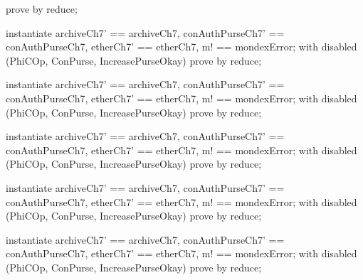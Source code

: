 \begin{LPScript}\begin{zproof}[tCIgnoreIsTotal]
    prove by reduce;
\end{zproof}\end{LPScript}

\begin{LPScript}\begin{zproof}[tCIncreaseIsTotal]
    instantiate archiveCh7' == archiveCh7,
        conAuthPurseCh7' == conAuthPurseCh7,
        etherCh7' == etherCh7, m! == mondexError;
    with disabled (PhiCOp, ConPurse, IncreasePurseOkay) prove by reduce;
\end{zproof}\end{LPScript}

\begin{LPScript}\begin{zproof}[tCAbortIsTotal]
    instantiate archiveCh7' == archiveCh7,
        conAuthPurseCh7' == conAuthPurseCh7,
        etherCh7' == etherCh7, m! == mondexError;
    with disabled (PhiCOp, ConPurse, IncreasePurseOkay) prove by reduce;
\end{zproof}\end{LPScript}

\begin{LPScript}\begin{zproof}[tCStartFromIsTotal]
    instantiate archiveCh7' == archiveCh7,
        conAuthPurseCh7' == conAuthPurseCh7,
        etherCh7' == etherCh7, m! == mondexError;
    with disabled (PhiCOp, ConPurse, IncreasePurseOkay) prove by reduce;
\end{zproof}\end{LPScript}

\begin{LPScript}\begin{zproof}[tCStartToIsTotal]
    instantiate archiveCh7' == archiveCh7,
        conAuthPurseCh7' == conAuthPurseCh7,
        etherCh7' == etherCh7, m! == mondexError;
    with disabled (PhiCOp, ConPurse, IncreasePurseOkay) prove by reduce;
\end{zproof}\end{LPScript}

\begin{LPScript}\begin{zproof}[tCReqIsTotal]
    instantiate archiveCh7' == archiveCh7,
        conAuthPurseCh7' == conAuthPurseCh7,
        etherCh7' == etherCh7, m! == mondexError;
    with disabled (PhiCOp, ConPurse, IncreasePurseOkay) prove by reduce;
\end{zproof}\end{LPScript}

